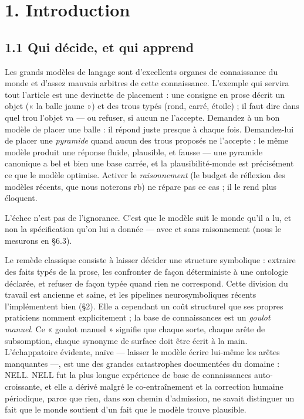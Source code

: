 \documentclass[11pt]{article}
\begin{document}
\section*{1. Introduction}

\subsection*{1.1 Qui décide, et qui apprend}

Les grands modèles de langage sont d'excellents organes de connaissance du monde et d'assez mauvais arbitres de cette connaissance. L'exemple qui servira tout l'article est une devinette de placement : une consigne en prose décrit un objet (« la balle jaune ») et des trous typés (rond, carré, étoile) ; il faut dire dans quel trou l'objet va — ou refuser, si aucun ne l'accepte. Demandez à un bon modèle de placer une balle : il répond juste presque à chaque fois. Demandez-lui de placer une \emph{pyramide} quand aucun des trous proposés ne l'accepte : le même modèle produit une réponse fluide, plausible, et fausse — une pyramide canonique a bel et bien une base carrée, et la plausibilité-monde est précisément ce que le modèle optimise. Activer le \emph{raisonnement} (le budget de réflexion des modèles récents, que nous noterons rb) ne répare pas ce cas ; il le rend plus éloquent.

L'échec n'est pas de l'ignorance. C'est que le modèle suit le monde qu'il a lu, et non la spécification qu'on lui a donnée — avec et sans raisonnement (nous le mesurons en §6.3).

Le remède classique consiste à laisser décider une structure symbolique : extraire des faits typés de la prose, les confronter de façon déterministe à une ontologie déclarée, et refuser de façon typée quand rien ne correspond. Cette division du travail est ancienne et saine, et les pipelines neurosymboliques récents l'implémentent bien (§2). Elle a cependant un coût structurel que ses propres praticiens nomment explicitement ; la base de connaissances est un \emph{goulot manuel}. Ce « goulot manuel » signifie que chaque sorte, chaque arête de subsomption, chaque synonyme de surface doit être écrit à la main. L'échappatoire évidente, naïve — laisser le modèle écrire lui-même les arêtes manquantes —, est une des grandes catastrophes documentées du domaine : NELL. NELL fut la plus longue expérience de base de connaissances auto-croissante, et elle a dérivé malgré le co-entraînement et la correction humaine périodique, parce que rien, dans son chemin d'admission, ne savait distinguer un fait que le monde soutient d'un fait que le modèle trouve plausible.
\end{document}
